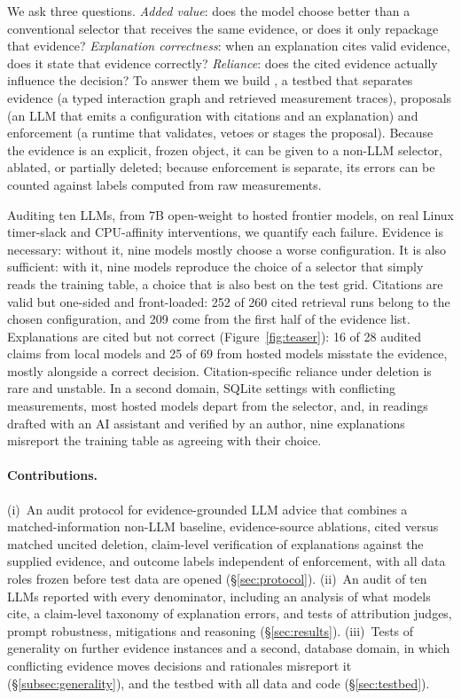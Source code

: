 We ask three questions. \emph{Added value}: does the model choose better than a conventional selector that receives the same evidence, or does it only repackage that evidence? \emph{Explanation correctness}: when an explanation cites valid evidence, does it state that evidence correctly? \emph{Reliance}: does the cited evidence actually influence the decision? To answer them we build \sysname, a testbed that separates evidence (a typed interaction graph and retrieved measurement traces), proposals (an LLM that emits a configuration with citations and an explanation) and enforcement (a runtime that validates, vetoes or stages the proposal). Because the evidence is an explicit, frozen object, it can be given to a non-LLM selector, ablated, or partially deleted; because enforcement is separate, its errors can be counted against labels computed from raw measurements.

Auditing ten LLMs, from 7B open-weight to hosted frontier models, on real Linux timer-slack and CPU-affinity interventions, we quantify each failure. Evidence is necessary: without it, nine models mostly choose a worse configuration. It is also sufficient: with it, nine models reproduce the choice of a selector that simply reads the training table, a choice that is also best on the test grid. Citations are valid but one-sided and front-loaded: 252 of 260 cited retrieval runs belong to the chosen configuration, and 209 come from the first half of the evidence list. Explanations are cited but not correct (Figure~\ref{fig:teaser}): 16 of 28 audited claims from local models and 25 of 69 from hosted models misstate the evidence, mostly alongside a correct decision. Citation-specific reliance under deletion is rare and unstable. In a second domain, SQLite settings with conflicting measurements, most hosted models depart from the selector, and, in readings drafted with an AI assistant and verified by an author, nine explanations misreport the training table as agreeing with their choice.

\paragraph{Contributions.}
(i)~An audit protocol for evidence-grounded LLM advice that combines a matched-information non-LLM baseline, evidence-source ablations, cited versus matched uncited deletion, claim-level verification of explanations against the supplied evidence, and outcome labels independent of enforcement, with all data roles frozen before test data are opened (\S\ref{sec:protocol}).
(ii)~An audit of ten LLMs reported with every denominator, including an analysis of what models cite, a claim-level taxonomy of explanation errors, and tests of attribution judges, prompt robustness, mitigations and reasoning (\S\ref{sec:results}).
(iii)~Tests of generality on further evidence instances and a second, database domain, in which conflicting evidence moves decisions and rationales misreport it (\S\ref{subsec:generality}), and the \sysname testbed with all data and code (\S\ref{sec:testbed}).

